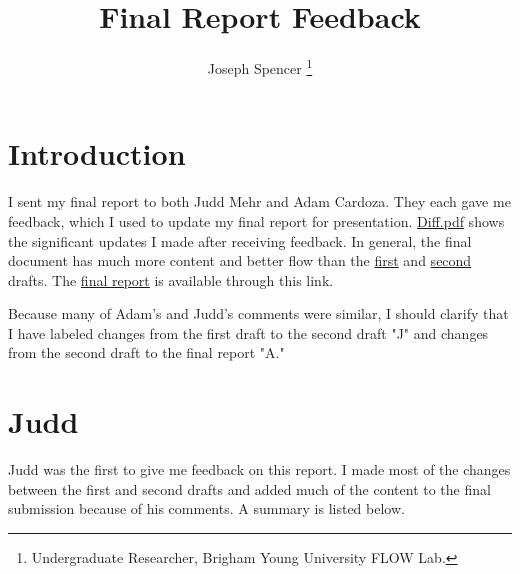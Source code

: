 \documentclass[journal ]{new-aiaa}
\title{Final Report Feedback}
\author{Joseph Spencer \footnote{Undergraduate Researcher, Brigham Young University FLOW Lab.}}
\affil{Brigham Young University, Provo, Utah, 84601}
\begin{document}
\maketitle


\section{Introduction}

I sent my final report to both Judd Mehr and Adam Cardoza. They each gave me feedback, which I used to update my final report for presentation. \href{Diff.pdf}{Diff.pdf} shows the significant updates I made after receiving feedback. In general, the final document has much more content and better flow than the \href{Draft_1.pdf}{first} and \href{Draft_2.pdf}{second} drafts. The \href{Final_Report.pdf}{final report} is available through this link.

Because many of Adam's and Judd's comments were similar, I should clarify that I have labeled changes from the first draft to the second draft "J" and changes from the second draft to the final report "A."

\section{Judd}

Judd was the first to give me feedback on this report. I made most of the changes between the first and second drafts and added much of the content to the final submission because of his comments. A summary is listed below.
\end{document}
